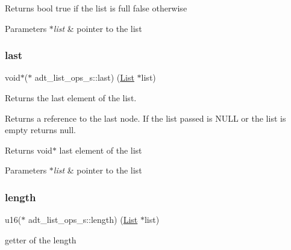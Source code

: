 \begin{DoxyReturn}{Returns}
bool true if the list is full false otherwise 
\end{DoxyReturn}

\begin{DoxyParams}{Parameters}
{\em $\ast$list} & pointer to the list \\
\hline
\end{DoxyParams}
\mbox{\label{structadt__list__ops__s_ae6de38828e67514b72f31d640daabe9f}} 
\subsubsection{\texorpdfstring{last}{last}}
{\footnotesize\ttfamily void$\ast$($\ast$ adt\+\_\+list\+\_\+ops\+\_\+s\+::last) (\hyperlink{structadt__list__s}{List} $\ast$list)}



Returns the last element of the list. 

Returns a reference to the last node. If the list passed is N\+U\+LL or the list is empty returns null.

\begin{DoxyReturn}{Returns}
void$\ast$ last element of the list 
\end{DoxyReturn}

\begin{DoxyParams}{Parameters}
{\em $\ast$list} & pointer to the list \\
\hline
\end{DoxyParams}
\mbox{\label{structadt__list__ops__s_ab83025de52b1802db4333bedfdc36d73}} 
\subsubsection{\texorpdfstring{length}{length}}
{\footnotesize\ttfamily u16($\ast$ adt\+\_\+list\+\_\+ops\+\_\+s\+::length) (\hyperlink{structadt__list__s}{List} $\ast$list)}



getter of the length 


